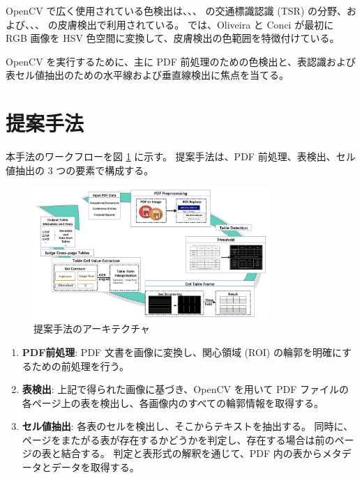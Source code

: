 \documentclass[uplatex, twocolumn,10pt]{jsarticle}
\begin{document}
OpenCV で広く使用されている色検出は、\cite{bib18}、\cite{bib19}、\cite{bib20} の交通標識認識 (TSR) の分野、および、\cite{bib21}、\cite{bib22}、\cite{bib23} の皮膚検出で利用されている。
\cite{bib21} では、Oliveira と Conci が最初に RGB 画像を HSV 色空間に変換して、皮膚検出の色範囲を特徴付けている。

OpenCV を実行するために、主に PDF 前処理のための色検出と、表認識および表セル値抽出のための水平線および垂直線検出に焦点を当てる。


\section{提案手法}
本手法のワークフローを図 \ref{fig1} に示す。
提案手法は、PDF 前処理、表検出、セル値抽出の 3 つの要素で構成する。

\begin{figure}[tp]
    \begin{center}
        \includegraphics*[width=0.8\textwidth]{image/master/master2/Fig1.png}
        \caption{提案手法のアーキテクチャ}
        \label{fig1}
    \end{center}
\end{figure}

\begin{enumerate}
    \item \textbf{PDF前処理}:
    PDF 文書を画像に変換し、関心領域 (ROI) の輪郭を明確にするための前処理を行う。
    \item \textbf{表検出}:
    上記で得られた画像に基づき、OpenCV を用いて PDF ファイルの各ページ上の表を検出し、各画像内のすべての輪郭情報を取得する。
    \item \textbf{セル値抽出}:
    各表のセルを検出し、そこからテキストを抽出する。
    同時に、ページをまたがる表が存在するかどうかを判定し、存在する場合は前のページの表と結合する。
    判定と表形式の解釈を通じて、PDF 内の表からメタデータとデータを取得する。
\end{enumerate}
\end{document}
